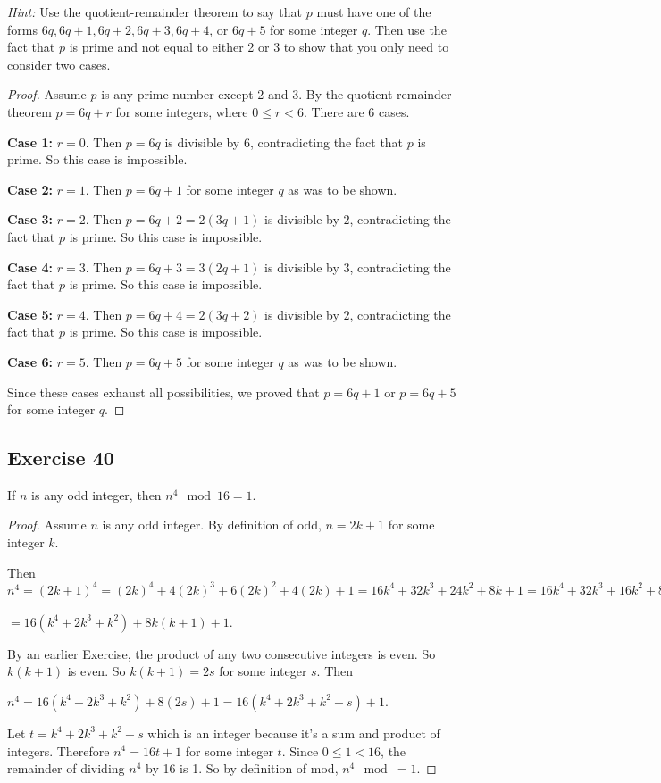 \documentclass[14pt]{extarticle}
\begin{document}
    {\it Hint:} Use the quotient-remainder theorem to say that $p$ must have one of the forms $6q, 6q + 1, 6q + 2, 6q + 3, 6q + 4$, or $6q + 5$ for some integer $q$. Then use the fact that $p$ is prime and not equal to either 2 or 3 to show that you only need to consider two cases.

\begin{proof}
    Assume $p$ is any prime number except 2 and 3. By the quotient-remainder theorem $p = 6q+r$ for some integers, where $0 \leq r < 6$. There are 6 cases.

        {\bf Case 1:} $r = 0$. Then $p = 6q$ is divisible by $6$, contradicting the fact that $p$ is prime. So this case is impossible.

        {\bf Case 2:} $r = 1$. Then $p = 6q+1$ for some integer $q$ as was to be shown.

        {\bf Case 3:} $r = 2$. Then $p = 6q+2 = 2(3q+1)$ is divisible by $2$, contradicting the fact that $p$ is prime. So this case is impossible.

        {\bf Case 4:} $r = 3$. Then $p = 6q+3 = 3(2q+1)$ is divisible by $3$, contradicting the fact that $p$ is prime. So this case is impossible.

        {\bf Case 5:} $r = 4$. Then $p = 6q+4 = 2(3q+2)$ is divisible by $2$, contradicting the fact that $p$ is prime. So this case is impossible.

        {\bf Case 6:} $r = 5$. Then $p = 6q+5$ for some integer $q$ as was to be shown.

    Since these cases exhaust all possibilities, we proved that $p = 6q+1$ or $p = 6q+5$ for some integer $q$.
\end{proof}

\subsection{Exercise 40}
If $n$ is any odd integer, then $n^4 \mod 16 = 1$.

\begin{proof}
    Assume $n$ is any odd integer. By definition of odd, $n = 2k+1$ for some integer $k$.

    Then $n^4 = (2k+1)^4 = (2k)^4 + 4(2k)^3 + 6(2k)^2 + 4(2k) + 1 = 16k^4 + 32k^3 + 24k^2 + 8k + 1 = 16k^4 + 32k^3 + 16k^2 + 8k^2 + 8k + 1 = 16(k^4 + 2k^3+ k^2) + 8k^2 + 8k + 1$

    $= 16(k^4 + 2k^3+ k^2) + 8k(k + 1) + 1$.

    By an earlier Exercise, the product of any two consecutive integers is even. So $k(k+1)$ is even. So $k(k+1) = 2s$ for some integer $s$. Then

    $n^4 = 16(k^4 + 2k^3+ k^2) + 8(2s) + 1 = 16(k^4 + 2k^3+ k^2 + s) + 1$.

    Let $t = k^4 + 2k^3+ k^2 + s$ which is an integer because it's a sum and product of integers. Therefore $n^4 = 16t + 1$ for some integer $t$. Since $0 \leq 1 < 16$, the remainder of dividing $n^4$ by 16 is 1. So by definition of mod, $n^4 \mod = 1$.
\end{proof}
\end{document}
